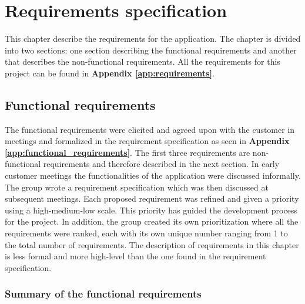 
\chapter{Requirements specification}

This chapter describe the requirements for the application. The chapter is divided into two sections: one section describing the functional requirements and another that describes the non-functional requirements. All the requirements for this project can be found in \textbf{Appendix \ref{app:requirements}}.

\section{Functional requirements}

The functional requirements were elicited and agreed upon with the customer in meetings and formalized in the requirement specification as seen in \textbf{Appendix \ref{app:functional_requirements}}. The first three requirements are non-functional requirements and therefore described in the next section. In early customer meetings the functionalities of the application were discussed informally. The group wrote a requirement specification which was then discussed at subsequent meetings. Each proposed requirement was refined and given a priority using a high-medium-low scale. This priority has guided the development process for the project. In addition, the group created its own prioritization where all the requirements were ranked, each with its own unique number ranging from 1 to the total number of requirements. The description of requirements in this chapter is less formal and more high-level than the one found in the requirement specification. 

\subsection{Summary of the functional requirements}
\label{subsec:summary_functional_requirements}

